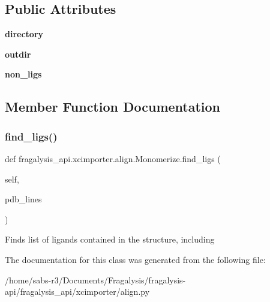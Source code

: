 \subsection*{Public Attributes}
\begin{DoxyCompactItemize}
\item 
\mbox{\label{classfragalysis__api_1_1xcimporter_1_1align_1_1_monomerize_a20636604f47438298d2420ce35297281}} 
{\bfseries directory}
\item 
\mbox{\label{classfragalysis__api_1_1xcimporter_1_1align_1_1_monomerize_a7d47cce7a11f51abbfc8b246b42f5181}} 
{\bfseries outdir}
\item 
\mbox{\label{classfragalysis__api_1_1xcimporter_1_1align_1_1_monomerize_ad165d10ed4bed3d12660094bcd82ea62}} 
{\bfseries non\+\_\+ligs}
\end{DoxyCompactItemize}


\subsection{Member Function Documentation}
\mbox{\label{classfragalysis__api_1_1xcimporter_1_1align_1_1_monomerize_a95bebe718abd76f9546c67db4a1848b3}} 
\subsubsection{\texorpdfstring{find\+\_\+ligs()}{find\_ligs()}}
{\footnotesize\ttfamily def fragalysis\+\_\+api.\+xcimporter.\+align.\+Monomerize.\+find\+\_\+ligs (\begin{DoxyParamCaption}\item[{}]{self,  }\item[{}]{pdb\+\_\+lines }\end{DoxyParamCaption})}

\begin{DoxyVerb}Finds list of ligands contained in the structure, including
\end{DoxyVerb}
 

The documentation for this class was generated from the following file\+:\begin{DoxyCompactItemize}
\item 
/home/sabs-\/r3/\+Documents/\+Fragalysis/fragalysis-\/api/fragalysis\+\_\+api/xcimporter/align.\+py\end{DoxyCompactItemize}
